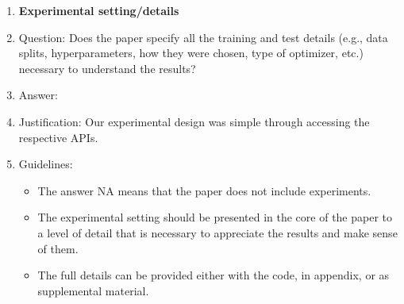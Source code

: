 \documentclass{article}
\begin{document}
\begin{enumerate}
\item {\bf Experimental setting/details}
    \item[] Question: Does the paper specify all the training and test details (e.g., data splits, hyperparameters, how they were chosen, type of optimizer, etc.) necessary to understand the results?
    \item[] Answer: \answerYes{} %
    \item[] Justification: Our experimental design was simple through accessing the respective APIs. 
    \item[] Guidelines:
    \begin{itemize}
        \item The answer NA means that the paper does not include experiments.
        \item The experimental setting should be presented in the core of the paper to a level of detail that is necessary to appreciate the results and make sense of them.
        \item The full details can be provided either with the code, in appendix, or as supplemental material.
    \end{itemize}


\end{enumerate}
\end{document}
